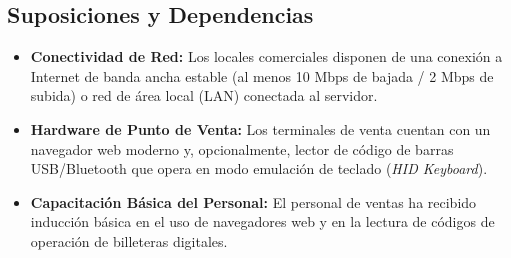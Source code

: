 \subsection{Suposiciones y Dependencias}
\begin{itemize}[leftmargin=*]
    \item \textbf{Conectividad de Red:} Los locales comerciales disponen de una conexión a Internet de banda ancha estable (al menos 10 Mbps de bajada / 2 Mbps de subida) o red de área local (LAN) conectada al servidor.
    \item \textbf{Hardware de Punto de Venta:} Los terminales de venta cuentan con un navegador web moderno y, opcionalmente, lector de código de barras USB/Bluetooth que opera en modo emulación de teclado (\textit{HID Keyboard}).
    \item \textbf{Capacitación Básica del Personal:} El personal de ventas ha recibido inducción básica en el uso de navegadores web y en la lectura de códigos de operación de billeteras digitales.
\end{itemize}
